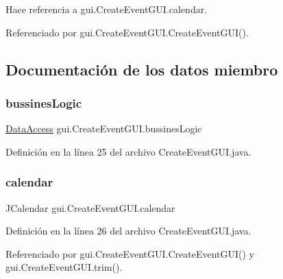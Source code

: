 Hace referencia a gui.\+Create\+Event\+G\+U\+I.\+calendar.



Referenciado por gui.\+Create\+Event\+G\+U\+I.\+Create\+Event\+G\+U\+I().



\subsection{Documentación de los datos miembro}
\mbox{\label{classgui_1_1CreateEventGUI_ac17ddd8a0373665374aa7f174b3ccd48}} 
\subsubsection{\texorpdfstring{bussinesLogic}{bussinesLogic}}
{\footnotesize\ttfamily \mbox{\hyperlink{classdataAccess_1_1DataAccess}{Data\+Access}} gui.\+Create\+Event\+G\+U\+I.\+bussines\+Logic\hspace{0.3cm}{\ttfamily [private]}}



Definición en la línea 25 del archivo Create\+Event\+G\+U\+I.\+java.

\mbox{\label{classgui_1_1CreateEventGUI_a27bb4d6170bc03fe771e186664b860aa}} 
\subsubsection{\texorpdfstring{calendar}{calendar}}
{\footnotesize\ttfamily J\+Calendar gui.\+Create\+Event\+G\+U\+I.\+calendar\hspace{0.3cm}{\ttfamily [private]}}



Definición en la línea 26 del archivo Create\+Event\+G\+U\+I.\+java.



Referenciado por gui.\+Create\+Event\+G\+U\+I.\+Create\+Event\+G\+U\+I() y gui.\+Create\+Event\+G\+U\+I.\+trim().

\mbox{\label{classgui_1_1CreateEventGUI_a45ab76afdfd93dac6437dc24b99abf34}} 
